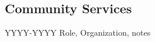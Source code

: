 \documentclass[11pt]{article}
\newenvironment{lyxlist}[1]
	{\begin{list}{}
		{\setlength\itemsep{-0.5ex}
		\settowidth{\labelwidth}{#1}
		 \setlength{\leftmargin}{\labelwidth}
		 \addtolength{\leftmargin}{\labelsep}
		 \renewcommand{\makelabel}[1]{##1\hfil}}}
	{\end{list}}
\begin{document}
\subsection*{Community Services}
\begin{lyxlist}{JHMI/regional}
\item[{YYYY-YYYY}]Role, Organization, notes
\end{lyxlist}


\end{document}
